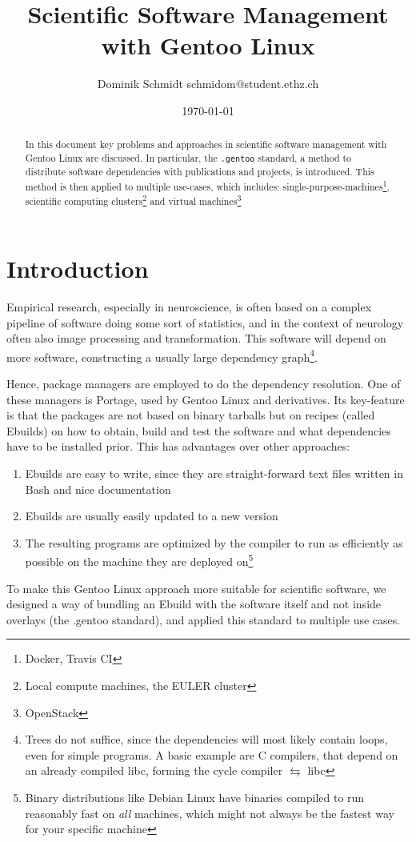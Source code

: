 \documentclass[11pt]{scrartcl}
\author{Dominik Schmidt \textsf{schmidom@student.ethz.ch}}
\title{Scientific Software Management with Gentoo Linux}
\date{\today}
\newcommand{\dg}[1]{\texttt{#1}}
\begin{document}
	\maketitle
	\begin{abstract}
		In this document key problems and approaches in scientific
		software management with Gentoo Linux are discussed.
		In particular, the \dg{.gentoo} standard, a method to distribute software dependencies with publications and projects, is introduced.
		This method is then applied to multiple use-cases, which includes:
		single-purpose-machines\footnote{Docker, Travis CI},
		scientific computing clusters\footnote{Local compute machines, the EULER cluster}
		and virtual machines\footnote{OpenStack}
	\end{abstract}
	\section{Introduction}
		Empirical research, especially in neuroscience, is often based on a complex pipeline of software doing some sort of statistics, and in the context of neurology often also image processing and transformation.
		This software will depend on more software, constructing a usually large dependency graph\footnote{Trees do not suffice, since the dependencies will most likely contain loops, even for simple programs. A basic example are C compilers, that depend on an already compiled libc, forming the cycle compiler $\leftrightarrows$ libc}.
		
		Hence, package managers are employed to do the dependency resolution.
		One of these managers is Portage, used by Gentoo Linux and derivatives.
		Its key-feature is that the packages are not based on binary tarballs but on recipes (called Ebuilds) on how to obtain, build and test the software and what dependencies have to be installed prior.
		This has advantages over other approaches:
		\begin{enumerate}
			\item Ebuilds are easy to write, since they are straight-forward text files written in Bash and nice documentation
			\item Ebuilds are usually easily updated to a new version
			\item The resulting programs are optimized by the compiler to run as efficiently as possible on the machine they are deployed on\footnote{Binary distributions like Debian Linux have binaries compiled to run reasonably fast on \emph{all} machines, which might not always be the fastest way for your specific machine}
		\end{enumerate}
		
		To make this Gentoo Linux approach more suitable for scientific software, we designed a way of bundling an Ebuild with the software itself and not inside overlays (the .gentoo standard), and applied this standard to multiple use cases.
	
	
	
	
	\appendix
	
\end{document}
